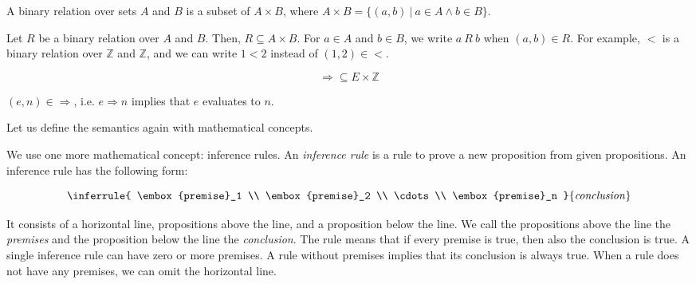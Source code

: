 \begin{kaobox}[frametitle=Binary relations]
A binary relation over sets $A$ and $B$ is a subset of $A\times B$,
where $A\times B=\{(a,b)\ |\ a\in A\land b\in B\}$.

Let $R$ be a binary relation over $A$ and $B$. Then, $R \subseteq A\times B$. For $a\in
A$ and $b\in B$, we write $a\ R\ b$ when $(a,b)\in R$. For example, $<$ is a
binary relation over $\mathbb{Z}$ and $\mathbb{Z}$, and we can write $1<2$ instead of
$(1,2)\in<$.
\end{kaobox}

\[\Rightarrow\subseteq E\times\mathbb{Z}\]

$(e,n)\in\Rightarrow$, i.e. $e\Rightarrow n$ implies that $e$ evaluates to $n$.

Let us define the semantics again with mathematical concepts.


\vspace{-1em}


\vspace{-1em}


We use one more mathematical concept: inference rules. An \textit{inference
rule} is a rule to prove a new proposition from given
propositions. An inference rule has the following form:

\[
  \inferrule
  { \embox{premise}_1 \\ \embox{premise}_2 \\ \cdots \\ \embox{premise}_n }
  { \embox{conclusion} }
\]

It consists of a horizontal line, propositions above the line, and a proposition
below the line. We call the propositions above the line the
\textit{premises} and the proposition below the line the
\textit{conclusion}. The rule means that if every premise is
true, then also the conclusion is true. A single inference rule can have zero or
more premises. A rule without premises implies that its conclusion is always
true. When a rule does not have any premises, we can omit the horizontal line.

